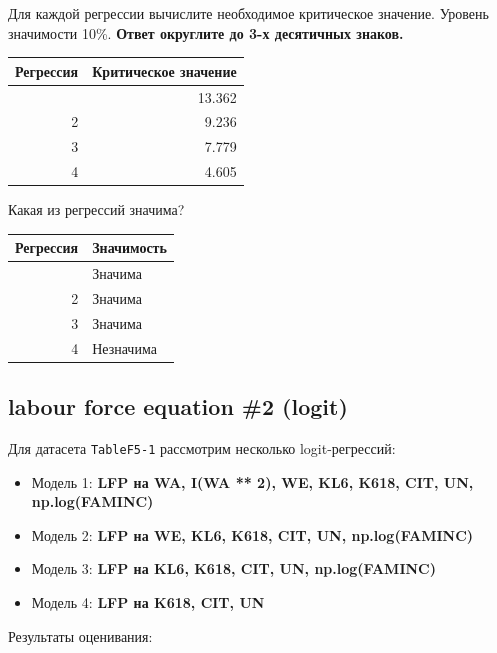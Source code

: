 \documentclass[
  russian,
]{article}
\newcounter{none} %
\providecommand{\tightlist}{%
  \setlength{\itemsep}{0pt}\setlength{\parskip}{0pt}}
\begin{document}
Для каждой регрессии вычислите необходимое критическое значение.
{Уровень значимости 10\%}. \textbf{Ответ округлите до 3-х десятичных
знаков.}

{\def\LTcaptype{none} %
\begin{longtable}[]{@{}rr@{}}
\toprule\noalign{}
Регрессия & Критическое значение \\
\midrule\noalign{}
\endhead
\bottomrule\noalign{}
\endlastfoot
1 & 13.362 \\
2 & 9.236 \\
3 & 7.779 \\
4 & 4.605 \\
\end{longtable}
}

Какая из регрессий значима?

{\def\LTcaptype{none} %
\begin{longtable}[]{@{}rl@{}}
\toprule\noalign{}
Регрессия & Значимость \\
\midrule\noalign{}
\endhead
\bottomrule\noalign{}
\endlastfoot
1 & Значима \\
2 & Значима \\
3 & Значима \\
4 & Незначима \\
\end{longtable}
}

\subsection{labour force equation \#2
(logit)}\label{labour-force-equation-2-logit-2}

Для датасета \texttt{TableF5-1} рассмотрим несколько logit-регрессий:

\begin{itemize}
\tightlist
\item
  Модель 1: \textbf{LFP на WA, I(WA ** 2), WE, KL6, K618, CIT, UN,
  np.log(FAMINC)}
\item
  Модель 2: \textbf{LFP на WE, KL6, K618, CIT, UN, np.log(FAMINC)}
\item
  Модель 3: \textbf{LFP на KL6, K618, CIT, UN, np.log(FAMINC)}
\item
  Модель 4: \textbf{LFP на K618, CIT, UN}
\end{itemize}

Результаты оценивания:
\end{document}
